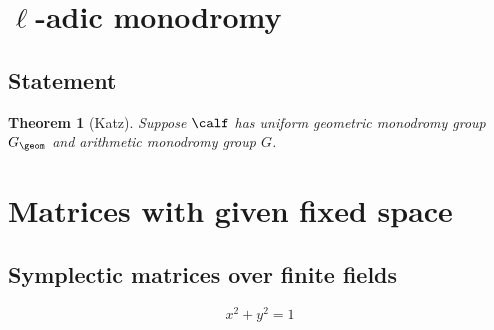 \documentclass{article}
\numberwithin{equation}{subsection}
\newtheorem{theorem}[equation]{Theorem}
\begin{document}
\section{$\ell$-adic monodromy}

\subsection{Statement}

\begin{theorem}[Katz]\label{katz} Suppose $\calf$ has uniform geometric
monodromy group $G_\geom$ and arithmetic monodromy group $G$.
\end{theorem}

\section{Matrices with given fixed space}

\subsection{Symplectic matrices over finite fields}

\begin{equation}
x^2+y^2=1 \label{unitcircle}
\end{equation}
\end{document}
